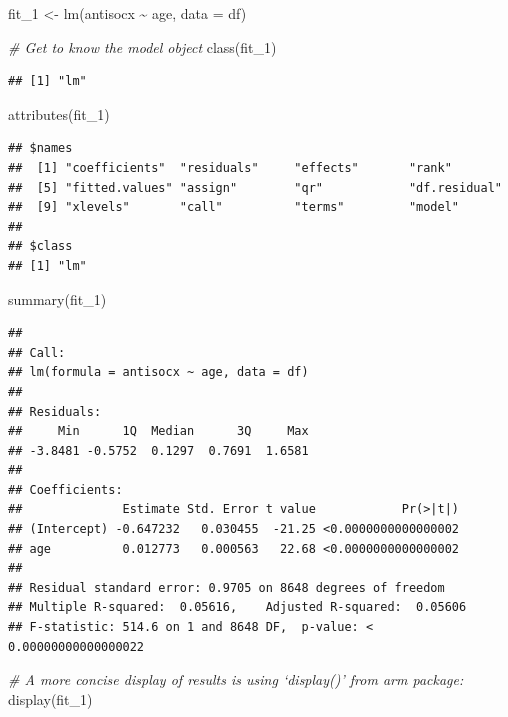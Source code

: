 \documentclass[
]{book}
\newenvironment{Shaded}{\begin{snugshade}}{\end{snugshade}}
\newcommand{\AttributeTok}[1]{\textcolor[rgb]{0.77,0.63,0.00}{#1}}
\newcommand{\CommentTok}[1]{\textcolor[rgb]{0.56,0.35,0.01}{\textit{#1}}}
\newcommand{\FunctionTok}[1]{\textcolor[rgb]{0.00,0.00,0.00}{#1}}
\newcommand{\NormalTok}[1]{#1}
\newcommand{\OtherTok}[1]{\textcolor[rgb]{0.56,0.35,0.01}{#1}}
\newcommand{\SpecialCharTok}[1]{\textcolor[rgb]{0.00,0.00,0.00}{#1}}
\begin{document}
\begin{Shaded}
\begin{Highlighting}[]
\NormalTok{fit\_1 }\OtherTok{\textless{}{-}} \FunctionTok{lm}\NormalTok{(antisocx }\SpecialCharTok{\textasciitilde{}}\NormalTok{ age, }\AttributeTok{data =}\NormalTok{ df)}

\CommentTok{\# Get to know the model object}
\FunctionTok{class}\NormalTok{(fit\_1)}
\end{Highlighting}
\end{Shaded}

\begin{verbatim}
## [1] "lm"
\end{verbatim}

\begin{Shaded}
\begin{Highlighting}[]
\FunctionTok{attributes}\NormalTok{(fit\_1)}
\end{Highlighting}
\end{Shaded}

\begin{verbatim}
## $names
##  [1] "coefficients"  "residuals"     "effects"       "rank"         
##  [5] "fitted.values" "assign"        "qr"            "df.residual"  
##  [9] "xlevels"       "call"          "terms"         "model"        
## 
## $class
## [1] "lm"
\end{verbatim}

\begin{Shaded}
\begin{Highlighting}[]
\FunctionTok{summary}\NormalTok{(fit\_1)}
\end{Highlighting}
\end{Shaded}

\begin{verbatim}
## 
## Call:
## lm(formula = antisocx ~ age, data = df)
## 
## Residuals:
##     Min      1Q  Median      3Q     Max 
## -3.8481 -0.5752  0.1297  0.7691  1.6581 
## 
## Coefficients:
##              Estimate Std. Error t value            Pr(>|t|)
## (Intercept) -0.647232   0.030455  -21.25 <0.0000000000000002
## age          0.012773   0.000563   22.68 <0.0000000000000002
## 
## Residual standard error: 0.9705 on 8648 degrees of freedom
## Multiple R-squared:  0.05616,    Adjusted R-squared:  0.05606 
## F-statistic: 514.6 on 1 and 8648 DF,  p-value: < 0.00000000000000022
\end{verbatim}

\begin{Shaded}
\begin{Highlighting}[]
\CommentTok{\# A more concise display of results is using ‘display()’ from arm package:}
\FunctionTok{display}\NormalTok{(fit\_1)}
\end{Highlighting}
\end{Shaded}
\end{document}

